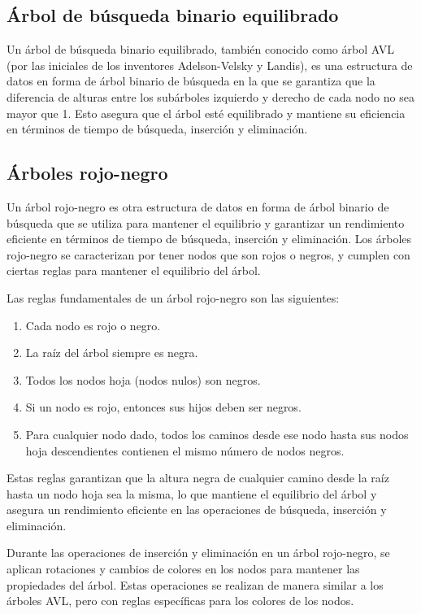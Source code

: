\subsection{Árbol de búsqueda binario equilibrado}
Un árbol de búsqueda binario equilibrado, también conocido como árbol AVL (por las iniciales de los inventores Adelson-Velsky y Landis), es una estructura de datos en forma de árbol binario de búsqueda en la que se garantiza que la diferencia de alturas entre los subárboles izquierdo y derecho de cada nodo no sea mayor que 1. Esto asegura que el árbol esté equilibrado y mantiene su eficiencia en términos de tiempo de búsqueda, inserción y eliminación.


\subsection{Árboles rojo-negro}
Un árbol rojo-negro es otra estructura de datos en forma de árbol binario de búsqueda que se utiliza para mantener el equilibrio y garantizar un rendimiento eficiente en términos de tiempo de búsqueda, inserción y eliminación. Los árboles rojo-negro se caracterizan por tener nodos que son rojos o negros, y cumplen con ciertas reglas para mantener el equilibrio del árbol.

Las reglas fundamentales de un árbol rojo-negro son las siguientes:

\begin{enumerate}
	\item Cada nodo es rojo o negro.
	\item La raíz del árbol siempre es negra. 
	\item Todos los nodos hoja (nodos nulos) son negros. 
	\item Si un nodo es rojo, entonces sus hijos deben ser negros. 
	\item Para cualquier nodo dado, todos los caminos desde ese nodo hasta sus nodos hoja descendientes contienen el mismo número de nodos negros. 
\end{enumerate}

Estas reglas garantizan que la altura negra de cualquier camino desde la raíz hasta un nodo hoja sea la misma, lo que mantiene el equilibrio del árbol y asegura un rendimiento eficiente en las operaciones de búsqueda, inserción y eliminación.

Durante las operaciones de inserción y eliminación en un árbol rojo-negro, se aplican rotaciones y cambios de colores en los nodos para mantener las propiedades del árbol. Estas operaciones se realizan de manera similar a los árboles AVL, pero con reglas específicas para los colores de los nodos.


